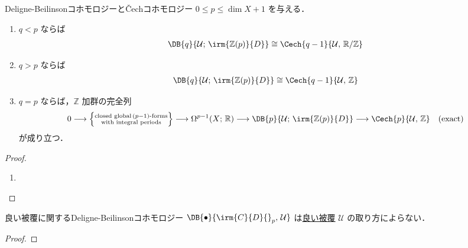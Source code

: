 \documentclass[TQFT_main]{subfiles}
\begin{document}
\begin{myprop}[label=prop:Deligne-Beilinson]{Deligne-Beilinsonコホモロジーと\v{C}echコホモロジー}
    $0 \le p \le \dim X + 1$ を与える．
    \begin{enumerate}
        \item $q < p$ ならば
        \begin{align}
            \DB{q}{\mathcal{U};\, \irm{\mathbb{Z}(p)}{D}} \cong \Cech{q-1}{\mathcal{U},\, \mathbb{R}/\mathbb{Z}}
        \end{align}
        \item $q > p$ ならば
        \begin{align}
            \DB{q}{\mathcal{U};\, \irm{\mathbb{Z}(p)}{D}} \cong \Cech{q-1}{\mathcal{U},\, \mathbb{Z}}
        \end{align}
        \item $q=p$ ならば，$\mathbb{Z}$ 加群の完全列
        \begin{align}
            0 \lto \Bigl\{ \substack{\text{closed global}\, (p-1)\text{-forms} \\ \text{with integral periods}} \Bigr\} \lto \Omega^{p-1}(X;\, \mathbb{R}) \lto \DB{p}{\mathcal{U};\, \irm{\mathbb{Z}(p)}{D}} \lto \Cech{p}{\mathcal{U},\, \mathbb{Z}} \quad (\text{exact})
        \end{align}
        が成り立つ．
    \end{enumerate}
\end{myprop}

\begin{proof}
    \begin{enumerate}
        \item 
    \end{enumerate}
\end{proof}

\begin{myprop}[label=prop:DB-good-cover]{良い被覆に関するDeligne-Beilinsonコホモロジー}
    $\DB{\bullet}{\irm{C}{D}{}_p,\, \mathcal{U}}$ は\hyperref[def:good-cover]{良い被覆} $\mathcal{U}$ の取り方によらない．
\end{myprop}

\begin{proof}
    
\end{proof}
\end{document}
